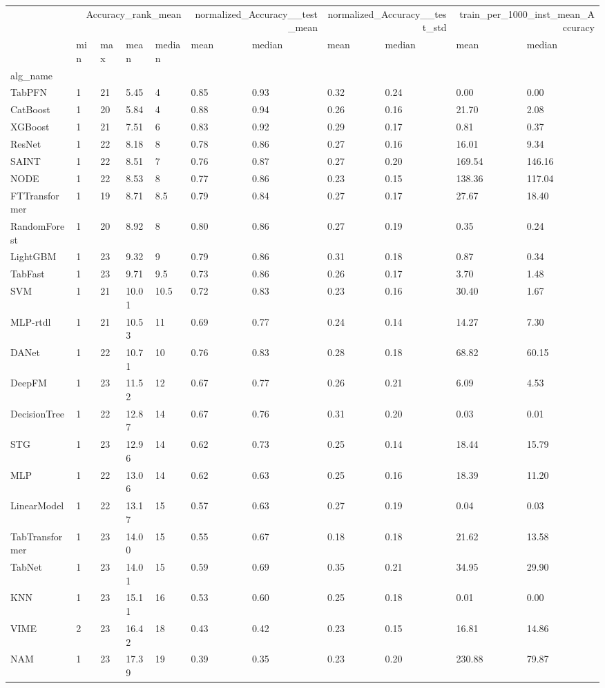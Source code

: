 \begin{tabular}{lllllllllll}
\toprule
 & \multicolumn{4}{r}{Accuracy_rank_mean} & \multicolumn{2}{r}{normalized_Accuracy__test_mean} & \multicolumn{2}{r}{normalized_Accuracy__test_std} & \multicolumn{2}{r}{train_per_1000_inst_mean_Accuracy} \\
 & min & max & mean & median & mean & median & mean & median & mean & median \\
alg_name &  &  &  &  &  &  &  &  &  &  \\
\midrule
TabPFN & 1 & 21 & 5.45 & 4 & 0.85 & 0.93 & 0.32 & 0.24 & 0.00 & 0.00 \\
CatBoost & 1 & 20 & 5.84 & 4 & 0.88 & 0.94 & 0.26 & 0.16 & 21.70 & 2.08 \\
XGBoost & 1 & 21 & 7.51 & 6 & 0.83 & 0.92 & 0.29 & 0.17 & 0.81 & 0.37 \\
ResNet & 1 & 22 & 8.18 & 8 & 0.78 & 0.86 & 0.27 & 0.16 & 16.01 & 9.34 \\
SAINT & 1 & 22 & 8.51 & 7 & 0.76 & 0.87 & 0.27 & 0.20 & 169.54 & 146.16 \\
NODE & 1 & 22 & 8.53 & 8 & 0.77 & 0.86 & 0.23 & 0.15 & 138.36 & 117.04 \\
FTTransformer & 1 & 19 & 8.71 & 8.5 & 0.79 & 0.84 & 0.27 & 0.17 & 27.67 & 18.40 \\
RandomForest & 1 & 20 & 8.92 & 8 & 0.80 & 0.86 & 0.27 & 0.19 & 0.35 & 0.24 \\
LightGBM & 1 & 23 & 9.32 & 9 & 0.79 & 0.86 & 0.31 & 0.18 & 0.87 & 0.34 \\
TabFast & 1 & 23 & 9.71 & 9.5 & 0.73 & 0.86 & 0.26 & 0.17 & 3.70 & 1.48 \\
SVM & 1 & 21 & 10.01 & 10.5 & 0.72 & 0.83 & 0.23 & 0.16 & 30.40 & 1.67 \\
MLP-rtdl & 1 & 21 & 10.53 & 11 & 0.69 & 0.77 & 0.24 & 0.14 & 14.27 & 7.30 \\
DANet & 1 & 22 & 10.71 & 10 & 0.76 & 0.83 & 0.28 & 0.18 & 68.82 & 60.15 \\
DeepFM & 1 & 23 & 11.52 & 12 & 0.67 & 0.77 & 0.26 & 0.21 & 6.09 & 4.53 \\
DecisionTree & 1 & 22 & 12.87 & 14 & 0.67 & 0.76 & 0.31 & 0.20 & 0.03 & 0.01 \\
STG & 1 & 23 & 12.96 & 14 & 0.62 & 0.73 & 0.25 & 0.14 & 18.44 & 15.79 \\
MLP & 1 & 22 & 13.06 & 14 & 0.62 & 0.63 & 0.25 & 0.16 & 18.39 & 11.20 \\
LinearModel & 1 & 22 & 13.17 & 15 & 0.57 & 0.63 & 0.27 & 0.19 & 0.04 & 0.03 \\
TabTransformer & 1 & 23 & 14.00 & 15 & 0.55 & 0.67 & 0.18 & 0.18 & 21.62 & 13.58 \\
TabNet & 1 & 23 & 14.01 & 15 & 0.59 & 0.69 & 0.35 & 0.21 & 34.95 & 29.90 \\
KNN & 1 & 23 & 15.11 & 16 & 0.53 & 0.60 & 0.25 & 0.18 & 0.01 & 0.00 \\
VIME & 2 & 23 & 16.42 & 18 & 0.43 & 0.42 & 0.23 & 0.15 & 16.81 & 14.86 \\
NAM & 1 & 23 & 17.39 & 19 & 0.39 & 0.35 & 0.23 & 0.20 & 230.88 & 79.87 \\
\bottomrule
\end{tabular}

